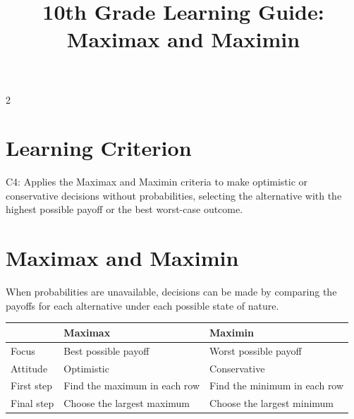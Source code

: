 \makeatletter
{}
\makeatother



\title{10th Grade Learning Guide: Maximax and Maximin}
\author{}
\date{}

\pagestyle{plain}



	\maketitle
	\vspace*{-2.5cm}
	
	\begin{multicols}{2}
		
		
		\section*{Learning Criterion}
		
		C4: Applies the Maximax and Maximin criteria to make optimistic or
		conservative decisions without probabilities, selecting the alternative
		with the highest possible payoff or the best worst-case outcome.
		
		
		\section{Maximax and Maximin}
		
		When probabilities are unavailable, decisions can be made by comparing
		the payoffs for each alternative under each possible state of nature.
		
		\begin{center}
			\renewcommand{\arraystretch}{1.3}
			\small
			\begin{tabular}{p{}p{0.34\columnwidth}p{}}
				\toprule
				& \textbf{Maximax} & \textbf{Maximin} \\
				\midrule
				Focus & Best possible payoff & Worst possible payoff \\
				Attitude & Optimistic & Conservative \\
				First step & Find the maximum in each row & Find the minimum in each row \\
				Final step & Choose the largest maximum & Choose the largest minimum \\
				\bottomrule
			\end{tabular}
		\end{center}
		

\end{multicols}
